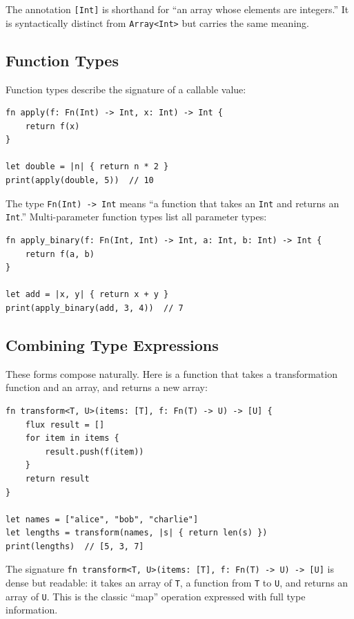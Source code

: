 The annotation \lstinline|[Int]| is shorthand for ``an array whose elements
are integers.'' It is syntactically distinct from \lstinline|Array<Int>| but
carries the same meaning.

\subsection{Function Types}

Function types describe the signature of a callable value:

\begin{lstlisting}[language=Lattice, caption={Function type annotations}]
fn apply(f: Fn(Int) -> Int, x: Int) -> Int {
    return f(x)
}

let double = |n| { return n * 2 }
print(apply(double, 5))  // 10
\end{lstlisting}

The type \lstinline|Fn(Int) -> Int| means ``a function that takes an
\lstinline|Int| and returns an \lstinline|Int|.'' Multi-parameter function
types list all parameter types:

\begin{lstlisting}[language=Lattice, caption={Multi-parameter function types}]
fn apply_binary(f: Fn(Int, Int) -> Int, a: Int, b: Int) -> Int {
    return f(a, b)
}

let add = |x, y| { return x + y }
print(apply_binary(add, 3, 4))  // 7
\end{lstlisting}

\subsection{Combining Type Expressions}

These forms compose naturally. Here is a function that takes a
transformation function and an array, and returns a new array:

\begin{lstlisting}[language=Lattice, caption={Combining function and array types}]
fn transform<T, U>(items: [T], f: Fn(T) -> U) -> [U] {
    flux result = []
    for item in items {
        result.push(f(item))
    }
    return result
}

let names = ["alice", "bob", "charlie"]
let lengths = transform(names, |s| { return len(s) })
print(lengths)  // [5, 3, 7]
\end{lstlisting}

The signature \lstinline|fn transform<T, U>(items: [T], f: Fn(T) -> U) -> [U]|
is dense but readable: it takes an array of \lstinline|T|, a function from
\lstinline|T| to \lstinline|U|, and returns an array of \lstinline|U|.
This is the classic ``map'' operation expressed with full type information.


